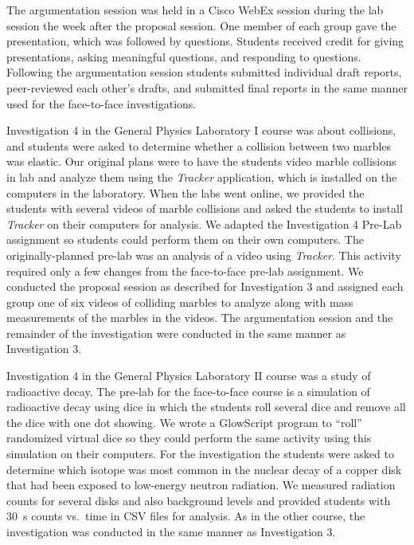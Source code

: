 \documentclass[aip, numerical, preprint]{revtex4-2}
\begin{document}
The argumentation session was held in a Cisco WebEx session during the lab session the week
after the proposal session. One member of each group gave the presentation, which was followed
by questions. Students received credit for giving presentations, asking meaningful questions,
and responding to questions.  Following the argumentation session students submitted individual
draft reports, peer-reviewed each other's drafts, and submitted final reports in the same
manner used for the face-to-face investigations.

Investigation 4 in the General Physics Laboratory I course was about collisions, and students
were asked to determine whether a collision between two marbles was elastic. Our original plans
were to have the students video marble collisions in lab and analyze them using the \emph{Tracker}
application\citep{bro2009}, which is installed on the computers in the laboratory. When the labs went online, we provided the students with several
videos of marble collisions and asked the students to install \emph{Tracker} on their computers for
analysis.  We adapted the Investigation 4 Pre-Lab assignment so students could perform them on
their own computers. The originally-planned pre-lab was an analysis of a video using
\emph{Tracker}. This activity required only a few changes from the face-to-face pre-lab assignment. We
conducted the proposal session as described for Investigation 3 and assigned each group one of
six videos of colliding marbles to analyze along with mass measurements of the marbles in the
videos. The argumentation session and the remainder of the investigation were conducted in the
same manner as Investigation 3.

Investigation 4 in the General Physics Laboratory II course was a study of radioactive
decay. The pre-lab for the face-to-face course is a simulation of radioactive decay using dice
in which the students roll several dice and remove all the dice with one dot showing. We wrote
a GlowScript\citep{glowscript} program to ``roll'' randomized virtual dice so they could
perform the same activity using this simulation on their computers. For the investigation the
students were asked to determine which isotope was most common in the nuclear decay of a copper
disk that had been exposed to low-energy neutron radiation. We measured radiation counts for
several disks and also background levels and provided students with \SI{30}{s} counts vs.\ time
in CSV files for analysis. As in the other course, the investigation was conducted in the same
manner as Investigation 3.
\end{document}
